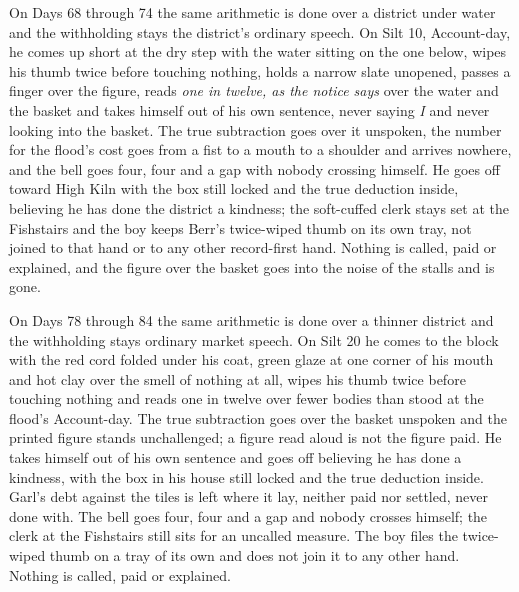 \documentclass{design/chronicle}
\begin{document}
{On Days 68 through 74 the same arithmetic is done over a district under water and the withholding stays the district’s ordinary speech. On Silt 10, Account-day, he comes up short at the dry step with the water sitting on the one below, wipes his thumb twice before touching nothing, holds a narrow slate unopened, passes a finger over the figure, reads \emph{one in twelve, as the notice says} over the water and the basket and takes himself out of his own sentence, never saying \emph{I} and never looking into the basket. The true subtraction goes over it unspoken, the number for the flood’s cost goes from a fist to a mouth to a shoulder and arrives nowhere, and the bell goes four, four and a gap with nobody crossing himself. He goes off toward High Kiln with the box still locked and the true deduction inside, believing he has done the district a kindness; the soft-cuffed clerk stays set at the Fishstairs and the boy keeps Berr’s twice-wiped thumb on its own tray, not joined to that hand or to any other record-first hand. Nothing is called, paid or explained, and the figure over the basket goes into the noise of the stalls and is gone.

On Days 78 through 84 the same arithmetic is done over a thinner district and the withholding stays ordinary market speech. On Silt 20 he comes to the block with the red cord folded under his coat, green glaze at one corner of his mouth and hot clay over the smell of nothing at all, wipes his thumb twice before touching nothing and reads one in twelve over fewer bodies than stood at the flood’s Account-day. The true subtraction goes over the basket unspoken and the printed figure stands unchallenged; a figure read aloud is not the figure paid. He takes himself out of his own sentence and goes off believing he has done a kindness, with the box in his house still locked and the true deduction inside. Garl’s debt against the tiles is left where it lay, neither paid nor settled, never done with. The bell goes four, four and a gap and nobody crosses himself; the clerk at the Fishstairs still sits for an uncalled measure. The boy files the twice-wiped thumb on a tray of its own and does not join it to any other hand. Nothing is called, paid or explained.

}
\end{document}
